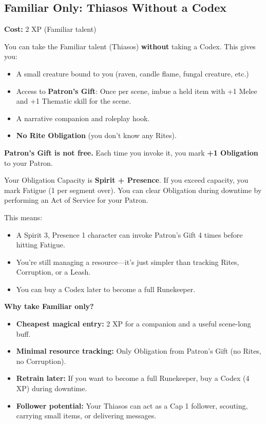 \subsection{Familiar Only: Thiasos Without a Codex}

\textbf{Cost:} 2 XP (Familiar talent)

You can take the Familiar talent (Thiasos) \textbf{without} taking a Codex. This gives you:

\begin{itemize}
  \item A small creature bound to you (raven, candle flame, fungal creature, etc.)
  \item Access to \textbf{Patron's Gift}: Once per scene, imbue a held item with +1 Melee and +1 Thematic skill for the scene.
  \item A narrative companion and roleplay hook.
  \item \textbf{No Rite Obligation} (you don't know any Rites).
\end{itemize}

\begin{tcolorbox}[colback=yellow!5!white,colframe=yellow!75!black,title=Important: Patron's Gift Costs Obligation,breakable]
\textbf{Patron's Gift is not free.} Each time you invoke it, you mark \textbf{+1 Obligation} to your Patron.

Your Obligation Capacity is \textbf{Spirit + Presence}. If you exceed capacity, you mark Fatigue (1 per segment over). You can clear Obligation during downtime by performing an Act of Service for your Patron.

This means:
\begin{itemize}
  \item A Spirit 3, Presence 1 character can invoke Patron's Gift 4 times before hitting Fatigue.
  \item You're still managing a resource---it's just simpler than tracking Rites, Corruption, or a Leash.
  \item You can buy a Codex later to become a full Runekeeper.
\end{itemize}
\end{tcolorbox}

\textbf{Why take Familiar only?}
\begin{itemize}
  \item \textbf{Cheapest magical entry:} 2 XP for a companion and a useful scene-long buff.
  \item \textbf{Minimal resource tracking:} Only Obligation from Patron's Gift (no Rites, no Corruption).
  \item \textbf{Retrain later:} If you want to become a full Runekeeper, buy a Codex (4 XP) during downtime.
  \item \textbf{Follower potential:} Your Thiasos can act as a Cap 1 follower, scouting, carrying small items, or delivering messages.
\end{itemize}

